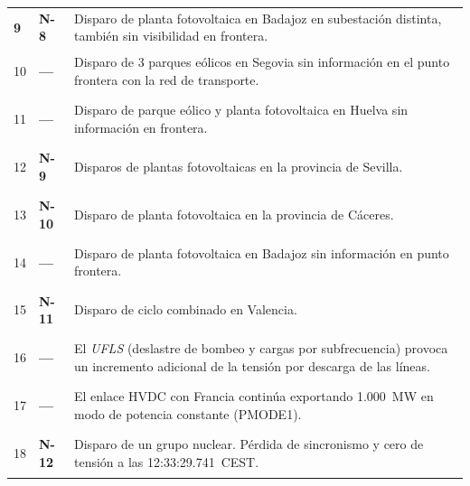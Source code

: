 \begin{table}[H]
\begin{tabularx}{\textwidth}{>{\centering\bfseries}p{1.1cm} >{\centering\bfseries}p{1.3cm} >{\centering\arraybackslash}X}
9 & N-8 &
Disparo de planta fotovoltaica en Badajoz en subestación distinta,
también sin visibilidad en frontera. \\
\addlinespace

10 & --- &
Disparo de 3 parques eólicos en Segovia sin información en el punto
frontera con la red de transporte. \\
\addlinespace

11 & --- &
Disparo de parque eólico y planta fotovoltaica en Huelva sin información
en frontera. \\
\addlinespace

12 & N-9 &
Disparos de plantas fotovoltaicas en la provincia de Sevilla. \\
\addlinespace

13 & N-10 &
Disparo de planta fotovoltaica en la provincia de Cáceres. \\
\addlinespace

14 & --- &
Disparo de planta fotovoltaica en Badajoz sin información en punto
frontera. \\
\addlinespace

15 & N-11 &
Disparo de ciclo combinado en Valencia. \\
\addlinespace

16 & --- &
El \textit{UFLS} (deslastre de bombeo y cargas por subfrecuencia) provoca
un incremento adicional de la tensión por descarga de las líneas. \\
\addlinespace

17 & --- &
El enlace HVDC con Francia continúa exportando 1.000~MW en modo de
potencia constante (PMODE1). \\
\addlinespace

18 & N-12 &
Disparo de un grupo nuclear. Pérdida de sincronismo y cero de tensión a
las 12:33:29.741~CEST. \\

\bottomrule
\end{tabularx}
\end{table}



